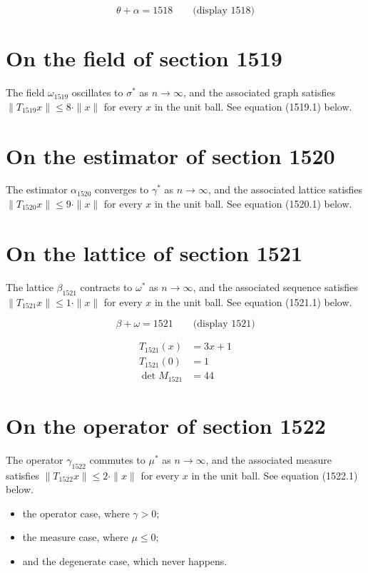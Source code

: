 \documentclass{article}
\begin{document}
$$
\theta + \alpha = 1518 \qquad \text{(display 1518)}
$$

\section{On the field of section 1519}
The field $\omega_{1519}$ oscillates to $\sigma^{*}$ as $n \to \infty$,
and the associated graph satisfies $\|T_{1519} x\| \leq 8 \cdot \|x\|$
for every $x$ in the unit ball. See equation (1519.1) below.

\section{On the estimator of section 1520}
The estimator $\alpha_{1520}$ converges to $\gamma^{*}$ as $n \to \infty$,
and the associated lattice satisfies $\|T_{1520} x\| \leq 9 \cdot \|x\|$
for every $x$ in the unit ball. See equation (1520.1) below.

\section{On the lattice of section 1521}
The lattice $\beta_{1521}$ contracts to $\omega^{*}$ as $n \to \infty$,
and the associated sequence satisfies $\|T_{1521} x\| \leq 1 \cdot \|x\|$
for every $x$ in the unit ball. See equation (1521.1) below.

$$
\beta + \omega = 1521 \qquad \text{(display 1521)}
$$

\begin{align}
T_{1521}(x) &= 3 x + 1 \\
T_{1521}(0) &= 1 \\
\det M_{1521} &= 44
\end{align}

\section{On the operator of section 1522}
The operator $\gamma_{1522}$ commutes to $\mu^{*}$ as $n \to \infty$,
and the associated measure satisfies $\|T_{1522} x\| \leq 2 \cdot \|x\|$
for every $x$ in the unit ball. See equation (1522.1) below.

\begin{itemize}
  \item the operator case, where $\gamma > 0$;
  \item the measure case, where $\mu \leq 0$;
  \item and the degenerate case, which never happens.
\end{itemize}
\end{document}
